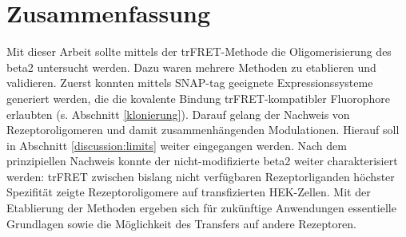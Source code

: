 \chapter{Zusammenfassung}\label{chapter:zusammenfassung}

Mit dieser Arbeit sollte mittels der trFRET-Methode die Oligomerisierung des \gls{beta2} untersucht werden. Dazu waren mehrere Methoden zu etablieren und validieren. Zuerst konnten mittels SNAP-tag geeignete Expressionssysteme generiert werden, die die kovalente Bindung trFRET-kompatibler Fluorophore erlaubten (s. Abschnitt \ref{klonierung}). Darauf gelang der Nachweis von Rezeptoroligomeren und damit zusammenhängenden Modulationen. Hierauf soll in Abschnitt \ref{discussion:limits} weiter eingegangen werden. Nach dem prinzipiellen Nachweis konnte der nicht-modifizierte \gls{beta2} weiter charakterisiert werden: trFRET zwischen bislang nicht verfügbaren Rezeptorliganden höchster Spezifität zeigte Rezeptoroligomere auf transfizierten HEK-Zellen. Mit der Etablierung der Methoden ergeben sich für zukünftige Anwendungen essentielle Grundlagen sowie die Möglichkeit des Transfers auf andere Rezeptoren.
